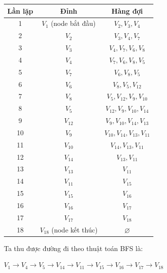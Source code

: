 \documentclass[a4paper, 11pt]{article}
\let\emptyset\varnothing
\begin{document}
\begin{center}
    \begin{tabular}{ |c|c|c| }
        \hline
        Lần lặp & Đỉnh & Hàng đợi\\
        \hline
        1 & $V_{1}$ (node bắt đầu) & $V_{2}, V_{3}, V_{4}$ \\
        \hline
        2 & $V_{2}$ & $V_{3}, V_{4}, V_{7}$ \\
        \hline
        3 & $V_{3}$ & $V_{4}, V_{7}, V_{6}, V_{8}$\\
        \hline
        4 & $V_{4}$ & $V_{7}, V_{6}, V_{8}, V_{5}$\\
        \hline
        5 & $V_{7}$ & $V_{6}, V_{8}, V_{5}$ \\
        \hline
        6 & $V_{6}$ & $V_{8}, V_{5}, V_{12}$  \\
        \hline
        7 & $V_{8}$ & $V_{5}, V_{12}, V_{9}, V_{10}$  \\
        \hline
        8 & $V_{5}$ & $V_{12}, V_{9}, V_{10}, V_{14}$ \\
        \hline
        9 & $V_{12}$ & $V_{9}, V_{10}, V_{14}, V_{13}$ \\
        \hline
        10 & $V_{9}$ & $V_{10}, V_{14}, V_{13}, V_{11}$  \\
        \hline
        11 & $V_{10}$ & $V_{14}, V_{13}, V_{11}$ \\
        \hline
        12 & $V_{14}$ & $V_{13}, V_{11}$ \\
        \hline
        13 & $V_{13}$ & $V_{11}$  \\
        \hline
        14 & $V_{11}$ & $V_{15}$ \\
        \hline
        15 & $V_{15}$ & $V_{16}$ \\
        \hline
        16 & $V_{16}$ & $V_{17}$ \\
        \hline
        17 & $V_{17}$ & $V_{18}$ \\
        \hline
        18 & $V_{18}$ (node kết thúc) & $\emptyset$ \\
        \hline
    \end{tabular}
\end{center}

Ta thu được đường đi theo thuật toán BFS là:
\begin{center}
    $V_{1} \rightarrow V_{4}  \rightarrow V_{5} \rightarrow V_{14} \rightarrow V_{11} \rightarrow V_{15} \rightarrow V_{16} \rightarrow V_{17} \rightarrow V_{18}$
\end{center}
\end{document}
